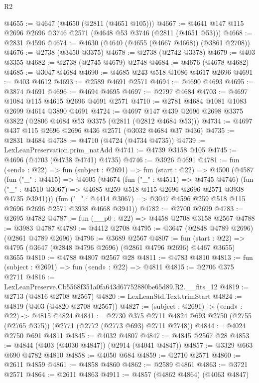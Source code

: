 \begin{lexlean}{R2}
\begin{coremodule}
@4655 := @4647 (@4650 (@2811 (@4651 @105)))
@4667 := @4641 @147 @115 @2696 @2696 @3746 @2571 (@4648 @53 @3746 (@2811 (@4651 @53)))
@4668 := @2831 @4596
@4674 := @4630 (@4640 (@4655 (@4667 @4668)) (@3861 @2708))
@4676 := @2738 (@3450 @3375)
@4678 := @2738 (@2742 @3378)
@4679 := @403 @3355
@4682 := @2738 (@2745 @4679) @2748
@4684 := @4676 (@4678 @4682)
@4685 := @3047 @4684
@4690 := @4685 @243 @518 @1086 @4617 @2696
@4691 := @403 @4612
@4693 := @2589 @4691 @2571
@4694 := @4690 @4693
@4695 := @3874 @4691
@4696 := @4694 @4695
@4697 := @2797 @4684
@4703 := @4697 @1084 @115 @4615 @2696 @4691 @2571
@4710 := @2781 @4684 @1081 @1083 @2699 @4614 @3890 @4691
@4724 := @4697 @147 @439 @2696 @2698 @3375 @3822 (@2806 @4684 @53 @3375 (@2811 (@2812 @4684 @53)))
@4734 := @4697 @437 @115 @2696 @2696 @436 @2571 (@3032 @4684 @37 @436)
@4735 := @2831 @4684
@4738 := @4710 (@4724 (@4734 @4735))
@4739 := LexLeanPreservation.prim_natAdd
@4741 := @4739 @3158 @105
@4745 := @4696 (@4703 (@4738 @4741) @4735)
@4746 := @3926 @4691
@4781 := fun («end» : @22) =>
  fun (subject : @2691) =>
  fun (start : @22) =>
  @4500
    (@4587
      (fun ("_" : @4415) =>
      @4605
        (@4674
          (fun ("_" : @4511) => @4745 @4746)
          (fun ("_" : @4510 @3067) => @4685 @259 @518 @115 @2696 @2696 @2571 @3938 @4735 @3941)))
      (fun ("_" : @4414 @3067) => @3047 @4596 @259 @518 @115 @2696 @2696 @2571 @3938 @4668 @3941))
@4782 := @2700 @2699
@4783 := @2695 @4782
@4787 := fun (__p0 : @22) => @4458 @2708 @3158 @2567
@4788 := @3983 @4787
@4789 := @4412 @2708
@4795 := @3647 (@2848 @4789 @2696) (@2861 @4789 @2696)
@4796 := @3689 @2567
@4807 := fun (start : @22) =>
  @4795 (@3647 (@2848 @4796 @2696) (@2861 @4796 @2696) @4467 @3655) @3655
@4810 := @4788 @4807 @2567 @28
@4811 := @4783 @4810
@4813 := fun (subject : @2691) => fun («end» : @22) => @4811
@4815 := @2706 @375 @2711
@4816 := LexLeanPreserve.Cb5568f351a0fa643d67752880be65d89.R2.__fits_12
@4819 := @2713 (@4816 @2708 @2567)
@4820 := LexLeanStd.Text.trimStart
@4824 := @4819 (@403 (@4820 @2708 @2567))
@4827 := (subject : @2691) -> («end» : @22) -> @4815 @4824
@4841 := @2730
    @375
    @2711
    @4824
    @693
    @2750
    (@2755 (@2765 @375))
    (@2771 (@2772 (@2773 @693) @2711 @2748))
@4844 := @4024 @2750 @691 @4811
@4845 := @4032 @4807
@4847 := @4845 @2567 @28
@4853 := @4844 (@403 (@4030 @4847)) (@2914 (@4041 @4847))
@4857 := @3329 @663 @690 @4782 @4810
@4858 := @4050 @684
@4859 := @2710 @2571
@4860 := @2611 @4859
@4861 := @4858 @4860
@4862 := @2589 @4861
@4863 := @3721 @2571
@4864 := @2611 @4863
@4911 := @4857
    (@4862 @4864)
    (@4063 @4847)

\end{coremodule}
\end{lexlean}
